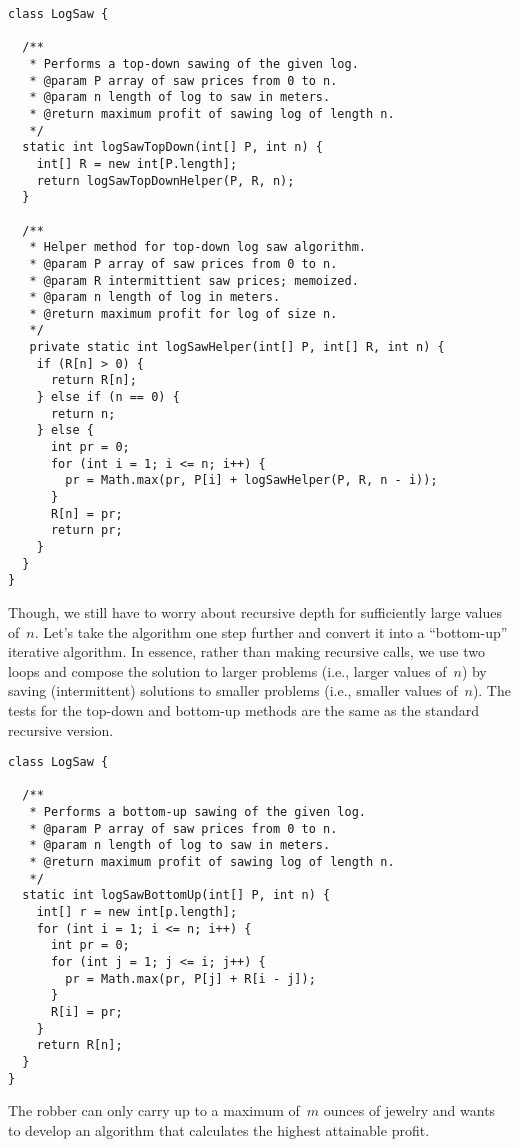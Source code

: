 \begin{lstlisting}[language=MyJava]
class LogSaw {

  /**
   * Performs a top-down sawing of the given log.
   * @param P array of saw prices from 0 to n.
   * @param n length of log to saw in meters.
   * @return maximum profit of sawing log of length n.
   */
  static int logSawTopDown(int[] P, int n) {
    int[] R = new int[P.length];
    return logSawTopDownHelper(P, R, n);
  }

  /**
   * Helper method for top-down log saw algorithm.
   * @param P array of saw prices from 0 to n.
   * @param R intermittient saw prices; memoized.
   * @param n length of log in meters.
   * @return maximum profit for log of size n.
   */
   private static int logSawHelper(int[] P, int[] R, int n) {
    if (R[n] > 0) {
      return R[n];
    } else if (n == 0) {
      return n;
    } else {
      int pr = 0;
      for (int i = 1; i <= n; i++) {
        pr = Math.max(pr, P[i] + logSawHelper(P, R, n - i));
      }
      R[n] = pr;
      return pr;
    }
  }
}
\end{lstlisting}

Though, we still have to worry about recursive depth for sufficiently large values of~$n$. 
Let's take the algorithm one step further and convert it into a ``bottom-up'' iterative algorithm.
In essence, rather than making recursive calls, we use two loops and compose the solution to larger problems (i.e., larger values of~$n$) by saving (intermittent) solutions to smaller problems (i.e., smaller values of~$n$).
The tests for the top-down and bottom-up methods are the same as the standard recursive version.

\enlargethispage{-1\baselineskip}
\begin{lstlisting}[language=MyJava]
class LogSaw {

  /**
   * Performs a bottom-up sawing of the given log.
   * @param P array of saw prices from 0 to n.
   * @param n length of log to saw in meters.
   * @return maximum profit of sawing log of length n.
   */
  static int logSawBottomUp(int[] P, int n) {
    int[] r = new int[p.length];
    for (int i = 1; i <= n; i++) {
      int pr = 0;
      for (int j = 1; j <= i; j++) {
        pr = Math.max(pr, P[j] + R[i - j]);
      }
      R[i] = pr;
    }
    return R[n];
  }
}
\end{lstlisting}

The robber can only carry up to a maximum of~$m$ ounces of jewelry and wants to develop an algorithm that calculates the highest attainable profit.

